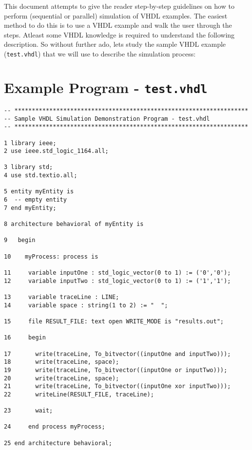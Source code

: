 \documentclass[12pt]{report}
\begin{document}
This document attempts to give the reader step-by-step guidelines on
how to perform (sequential or parallel) simulation of VHDL examples. The
easiest method to do this is to use a VHDL example and walk the user
through the steps.  Atleast some VHDL knowledge is required to understand
the following description.  So without further ado, lets study the sample
VHDL example (\texttt{test.vhdl}) that we will use to describe the
simulation process:

\section{Example Program - \texttt{test.vhdl}}

\begin{verbatim}
-- *******************************************************************
-- Sample VHDL Simulation Demonstration Program - test.vhdl
-- *******************************************************************

1 library ieee;
2 use ieee.std_logic_1164.all;

3 library std;
4 use std.textio.all;

5 entity myEntity is
6  -- empty entity
7 end myEntity;

8 architecture behavioral of myEntity is
  
9   begin
    
10    myProcess: process is
  
11     variable inputOne : std_logic_vector(0 to 1) := ('0','0'); 
12     variable inputTwo : std_logic_vector(0 to 1) := ('1','1'); 

13     variable traceLine : LINE;
14     variable space : string(1 to 2) := "  ";

15     file RESULT_FILE: text open WRITE_MODE is "results.out";

16     begin

17       write(traceLine, To_bitvector((inputOne and inputTwo)));
18       write(traceLine, space);
19       write(traceLine, To_bitvector((inputOne or inputTwo)));
20       write(traceLine, space);
21       write(traceLine, To_bitvector((inputOne xor inputTwo)));
22       writeLine(RESULT_FILE, traceLine);

23       wait;

24     end process myProcess;

25 end architecture behavioral;  

\end{verbatim}
\end{document}
